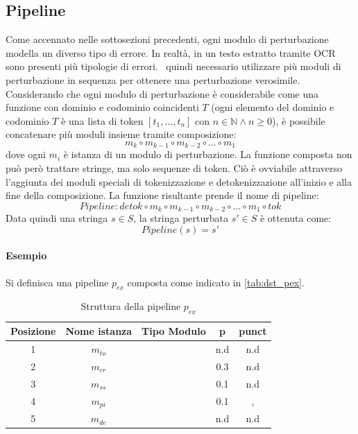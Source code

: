 \subsection{Pipeline}
\label{sec:dst:pipeline}
Come accennato nelle sottosezioni precedenti, ogni modulo di perturbazione modella un diverso tipo di errore. In realtà, in un testo estratto tramite OCR sono presenti più tipologie di errori. \E\ quindi necessario utilizzare più moduli di perturbazione in sequenza per ottenere una perturbazione verosimile. Considerando che ogni modulo di perturbazione è considerabile come una funzione con dominio e codominio coincidenti $T$ (ogni elemento del dominio e codominio $T$ è una lista di token $[t_1,...,t_n]$ con $ n \in \mathbb{N} \wedge n \geqslant 0$), è possibile concatenare più moduli insieme tramite composizione:
\begin{equation}
m_k \circ m_{k-1} \circ m_{k-2} \circ ... \circ m_1
\end{equation}
dove ogni $m_i$ è istanza di un modulo di perturbazione. La funzione composta non può però trattare stringe, ma solo sequenze di token. Ciò è ovviabile attraverso l'aggiunta dei moduli speciali di tokenizzazione e detokenizzazione all'inizio e alla fine della composizione. La funzione risultante prende il nome di pipeline:
\begin{equation}
Pipeline: detok \circ m_k \circ m_{k-1} \circ m_{k-2} \circ ... \circ m_1 \circ tok
\end{equation}
Data quindi una stringa $s \in S$, la stringa perturbata $s\prime \in S$ è ottenuta come:
\begin{equation}
Pipeline(s) = s\prime
\end{equation}

\paragraph{Esempio}
Si definisca una pipeline $p_{ex}$ composta come indicato in \autoref{tab:dst_pex}.

\begin{table}[H]
\centering
\begin{tabular}{ccccc}
\textbf{Posizione} & \textbf{Nome istanza} & \textbf{Tipo Modulo} & \textbf{p} & \textbf{punct}\\ \hline
1	& $m_{to}$	& \mto	& n.d 	& n.d 	\\
2	& $m_{cr}$	& \mcr	& 0.3	& n.d 	\\
3	& $m_{ss}$	& \mss	& 0.1	& n.d 	\\
4	& $m_{pi}$	& \mpi	& 0.1	& , 	\\
5	& $m_{de}$	& \mde	& n.d 	& n.d 	\\
\end{tabular}
\caption{Struttura della pipeline $p_{ex}$}
\label{tab:dst_pex}
\end{table}

